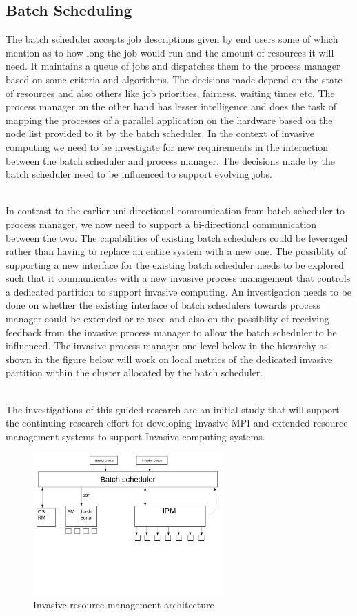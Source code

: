 \documentclass{article}
\begin{document}
\subsection{Batch Scheduling}
The batch scheduler accepts job descriptions given by end users some of which mention as to how long the job would run and the amount of resources it will need. It maintains a queue of jobs and dispatches them to the process manager based on some criteria and algorithms. The decisions made depend on the state of resources and also others like job priorities, fairness, waiting times etc. The process manager on the other hand has lesser intelligence and does the task of mapping the processes of a parallel application on the hardware based on the node list provided to it by the batch scheduler. In the context of invasive computing we need to be investigate for new requirements in the interaction between the batch scheduler and process manager. The decisions made by the batch scheduler need to be influenced to support evolving jobs.\par
\noindent
\\In contrast to the earlier uni-directional communication from batch scheduler to process manager, we now need to support a bi-directional communication between the two. The capabilities of existing batch schedulers could be leveraged rather than having to replace an entire system with a new one. The possiblity of supporting a new interface for the existing batch scheduler needs to be explored such that it communicates with a new invasive process management that controls a dedicated partition to support invasive computing. An investigation needs to be done on whether the existing interface of batch schedulers towards process manager could be extended or re-used and also on the possiblity of receiving feedback from the invasive process manager to allow the batch scheduler to be influenced. The invasive process manager one level below in the hierarchy as shown in the figure below will work on local metrics of the dedicated invasive partition within the cluster allocated by the batch scheduler.\par
\noindent
\\The investigations of this guided research are an initial study that will support the continuing research effort for developing Invasive MPI and extended resource management systems to support Invasive computing systems.

\begin{figure}[h]
\centering
\includegraphics[width=0.65\textwidth, clip, trim=0mm 60mm 0mm 0mm]{data/architecture.pdf}
\vspace{-0.15in}
\caption{Invasive resource management architecture}
\label{fig:arch}
\end{figure}
\end{document}
